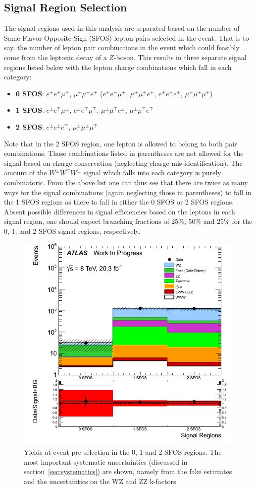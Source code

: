 \subsection{Signal Region Selection}
\label{sec:signal_regions}
The signal regions used in this analysis are separated based on the number of 
Same-Flavor Opposite-Sign (SFOS) lepton pairs selected in the event.  That is to say,
the number of lepton pair combinations in the event 
which could feasibly come from the leptonic decay of a $Z$-boson.
This results in three separate signal regions listed 
below with the lepton charge combinations
which fall in each category:
\begin{itemize}
\item \textbf{0 SFOS}: $e^{\pm}e^{\pm}\mu^{\mp}$, 
$\mu^{\pm}\mu^{\pm}e^{\mp}$ ($e^{\pm}e^{\pm}\mu^{\pm}$, 
$\mu^{\pm}\mu^{\pm}e^{\pm}$, $e^{\pm}e^{\pm}e^{\pm}$, $\mu^{\pm}\mu^{\pm}\mu^{\pm}$)
\item \textbf{1 SFOS}: $e^{\pm}e^{\mp}\mu^{\pm}$, 
$e^{\pm}e^{\mp}\mu^{\mp}$, $\mu^{\pm}\mu^{\mp}e^{\pm}$, $\mu^{\pm}\mu^{\mp}e^{\mp}$
\item \textbf{2 SFOS}: $e^{\pm}e^{\pm}e^{\mp}$, $\mu^{\pm}\mu^{\pm}\mu^{\mp}$
\end{itemize}
Note that in the 2 SFOS region, one lepton is allowed to belong to both 
pair combinations.
Those combinations listed in parentheses are not allowed for the signal based on charge conservation (neglecting charge mis-identification).  
The amount of the $W^{\pm}W^{\mp}W^{\pm}$ signal
which falls into each category is purely combinatoric.  
From the above list one can thus see that there are twice as many ways 
for the signal combinations (again neglecting those in parentheses)
to fall in the 1 SFOS regions as 
there to fall in either the 0 SFOS or 2 SFOS regions. 
Absent possible differences in signal efficiencies based on the leptons in each 
signal region, one should expect branching 
fractions of 25\%, 50\% and 25\% for the 0, 1, and 2 SFOS signal regions, respectively.


\begin{figure}[ht!]
\centering
\includegraphics[width=0.5\columnwidth]{figures/SFOSPreselection.png}
\caption{Yields at event pre-selection in the 0, 1 and 2 SFOS regions.  
The most important systematic uncertainties 
(discussed in section~\ref{sec:systematics}) are shown, 
namely from the fake estimates and the uncertainties on the WZ and ZZ k-factors.}
\label{fig:preselection_nsfos}
\end{figure}

